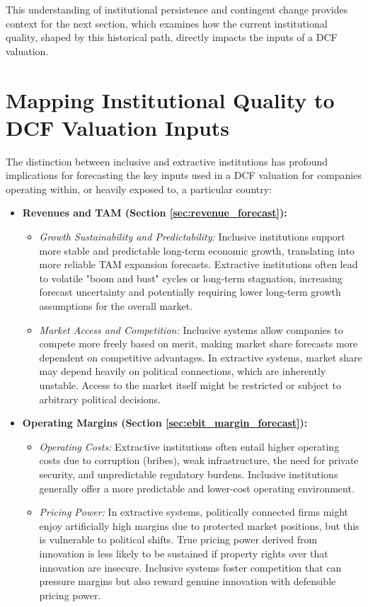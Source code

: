 This understanding of institutional persistence and contingent change provides context for the next section, which examines how the current institutional quality, shaped by this historical path, directly impacts the inputs of a DCF valuation.

\section{Mapping Institutional Quality to DCF Valuation Inputs} \label{sec:map_institutions_to_dcf}

The distinction between inclusive and extractive institutions has profound implications for forecasting the key inputs used in a DCF valuation for companies operating within, or heavily exposed to, a particular country:

\begin{itemize}
    \item \textbf{Revenues and TAM (Section \ref{sec:revenue_forecast}):}
          \begin{itemize}
              \item \textit{Growth Sustainability and Predictability:} Inclusive institutions support more stable and predictable long-term economic growth, translating into more reliable TAM expansion forecasts. Extractive institutions often lead to volatile "boom and bust" cycles or long-term stagnation, increasing forecast uncertainty and potentially requiring lower long-term growth assumptions for the overall market.
              \item \textit{Market Access and Competition:} Inclusive systems allow companies to compete more freely based on merit, making market share forecasts more dependent on competitive advantages. In extractive systems, market share may depend heavily on political connections, which are inherently unstable. Access to the market itself might be restricted or subject to arbitrary political decisions.
          \end{itemize}

    \item \textbf{Operating Margins (Section \ref{sec:ebit_margin_forecast}):}
          \begin{itemize}
              \item \textit{Operating Costs:} Extractive institutions often entail higher operating costs due to corruption (bribes), weak infrastructure, the need for private security, and unpredictable regulatory burdens. Inclusive institutions generally offer a more predictable and lower-cost operating environment.
              \item \textit{Pricing Power:} In extractive systems, politically connected firms might enjoy artificially high margins due to protected market positions, but this is vulnerable to political shifts. True pricing power derived from innovation is less likely to be sustained if property rights over that innovation are insecure. Inclusive systems foster competition that can pressure margins but also reward genuine innovation with defensible pricing power.
          \end{itemize}


\end{itemize}

